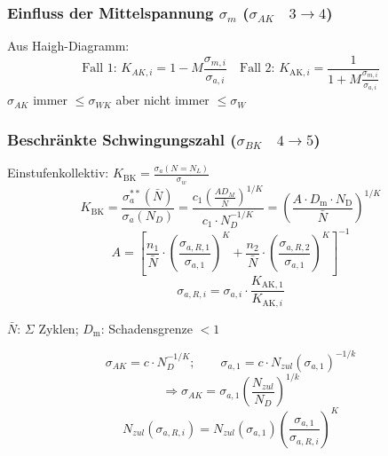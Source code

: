         \subsubsection{Einfluss der Mittelspannung $\sigma_m$ ($\sigma_{AK}\quad3\rightarrow4$)}
            Aus Haigh-Diagramm:
            \[\textrm{Fall 1: }K_{AK,i}=1-M\frac{\sigma_{m,i}}{\sigma_{a,i}}\quad\textrm{Fall 2: }K_{\textrm{AK},i}=\frac{1}{1+M\frac{\sigma_{m,i}}{\sigma_{a,i}}}\]
            $\sigma_{AK}$ immer $\leq\sigma_{WK}$ aber nicht immer $\leq\sigma_W$
        \subsubsection{Beschränkte Schwingungszahl ($\sigma_{BK}\quad4\rightarrow5$)}
            Einstufenkollektiv: $\displaystyle K_{\textrm{BK}}= \frac{\sigma_{a}(N=N_L)}{\sigma_w}$\\
            \[ K_{\textrm{BK}}=\frac{\sigma_{a}^{**}(\bar{N})}{\sigma_{a}(N_{D})}=\frac{c_1\left(\frac{AD_M}{\bar{N}}\right)^{1/K}}{c_1\cdot N_D^{-1/K}}=\left(\frac{A\cdot D_{\textrm{m}}\cdot N_{\textrm{D}}}{\bar{N}}\right)^{1/K}\]
            \[A = \left[\frac{n_1}{\bar{N}}\cdot\left(\frac{\sigma_{a,R,1}}{\sigma_{a,1}}\right)^{K}+\frac{n_2}{\bar{N}}\cdot\left(\frac{\sigma_{a,R,2}}{\sigma_{a,1}}\right)^{K}\right]^{-1}\]
            \[ \sigma_{a,R,i}=\sigma_{a,i}\cdot\frac{K_{\textrm{AK},1}}{K_{\textrm{AK},i}}\]
            
            $\bar{N}$: $\Sigma$ Zyklen; \qquad $D_{\textrm{m}}$: Schadensgrenze $<1$
            
            \[\sigma_{AK}=c\cdot N_D^{-1/K}; \qquad \sigma_{a,1}= c\cdot N_{zul}(\sigma_{a,1})^{-1/k}\]
            \[\Rightarrow \sigma_{AK}= \sigma_{a,1}\left(\frac{N_{zul}}{N_D}\right)^{1/k}\]
            \[N_{zul}(\sigma_{a,R,i})=N_{zul}(\sigma_{a,1})\left(\frac{\sigma_{a,1}}{\sigma_{a,R,i}}\right)^K\]

\vfill\null\columnbreak